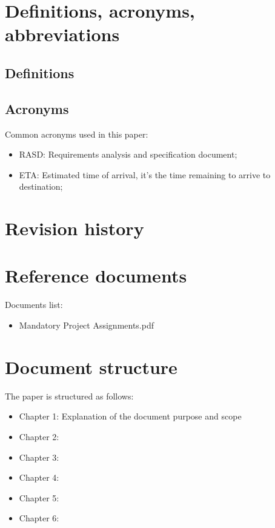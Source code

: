 \section{Definitions, acronyms, abbreviations}
%
\subsection{Definitions}
%
\subsection{Acronyms}
Common acronyms used in this paper:
\begin{itemize}
\item RASD: Requirements analysis and specification document;
\item ETA: Estimated time of arrival, it's the time remaining to arrive to destination;
\end{itemize}
%
%
\section{Revision history}
%
%
\section{Reference documents}
Documents list:
\begin{itemize}
\item Mandatory Project Assignments.pdf
\end{itemize}
%
%
\section{Document structure}
The paper is structured as follows:
\begin{itemize}
\item Chapter 1: Explanation of the document purpose and scope
\item Chapter 2:
\item Chapter 3:
\item Chapter 4:
\item Chapter 5:
\item Chapter 6:
\end{itemize}
%
